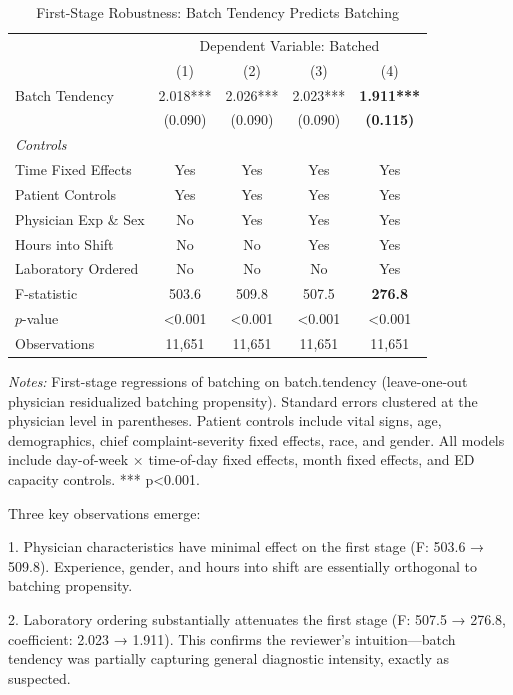 \documentclass[11pt]{article}
\newcommand{\1}{\hbox{\rm 1\kern-.35em 1}}
\begin{document}
{\begin{table}[ht]
\centering
\caption*{First-Stage Robustness: Batch Tendency Predicts Batching}
\label{tab:first_stage_robustness}
\begin{threeparttable}
\begin{tabular}{lcccc}
\toprule 
& \multicolumn{4}{c}{Dependent Variable: Batched}\\
\cmidrule(lr){2-5}
& (1) & (2) & (3) & (4) \\
\midrule
Batch Tendency & 2.018*** & 2.026*** & 2.023*** & \textbf{1.911***} \\ 
& (0.090) & (0.090) & (0.090) & \textbf{(0.115)} \\
\midrule
\textit{Controls} \\
Time Fixed Effects & Yes & Yes & Yes & Yes \\
Patient Controls & Yes & Yes & Yes & Yes \\
Physician Exp \& Sex & No & Yes & Yes & Yes \\
Hours into Shift & No & No & Yes & Yes \\
Laboratory Ordered & No & No & No & Yes \\
\midrule
F-statistic & 503.6 & 509.8 & 507.5 & \textbf{276.8} \\
$p$-value & <0.001 & <0.001 & <0.001 & <0.001 \\
Observations & 11,651 & 11,651 & 11,651 & 11,651 \\
\bottomrule
\end{tabular}
\begin{tablenotes}
\footnotesize
\item \textit{Notes:} First-stage regressions of batching on batch.tendency (leave-one-out physician residualized batching propensity). Standard errors clustered at the physician level in parentheses. Patient controls include vital signs, age, demographics, chief complaint-severity fixed effects, race, and gender. All models include day-of-week × time-of-day fixed effects, month fixed effects, and ED capacity controls. *** p<0.001.
\end{tablenotes}
\end{threeparttable}
\end{table}

Three key observations emerge:

1. Physician characteristics have minimal effect on the first stage (F: 503.6 → 509.8). Experience, gender, and hours into shift are essentially orthogonal to batching propensity.

2. Laboratory ordering substantially attenuates the first stage (F: 507.5 → 276.8, coefficient: 2.023 → 1.911). This confirms the reviewer's intuition—batch tendency was partially capturing general diagnostic intensity, exactly as suspected.

}
\end{document}
